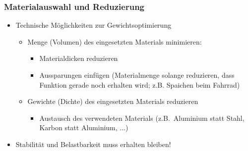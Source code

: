 \subsubsection{Materialauswahl und Reduzierung}
\begin{itemize}
	\item Technische Möglichkeiten zur Gewichtsoptimierung
	\begin{itemize}
		\item Menge (Volumen) des eingesetzten Materials minimieren:
		\begin{itemize}
			\item Materialdicken reduzieren
			\item Aussparungen einfügen (Materialmenge solange reduzieren, dass Funktion gerade noch erhalten wird; z.B. Spaichen beim Fahrrad)
		\end{itemize}
		\item Gewichte (Dichte) des eingesetzten Materials reduzieren
		\begin{itemize}
			\item Austausch des verwendeten Materials (z.B.\ Aluminium statt Stahl, Karbon statt Aluminium, ...)
		\end{itemize}
	\end{itemize}
	\item Stabilität und Belastbarkeit muss erhalten bleiben!
\end{itemize}

